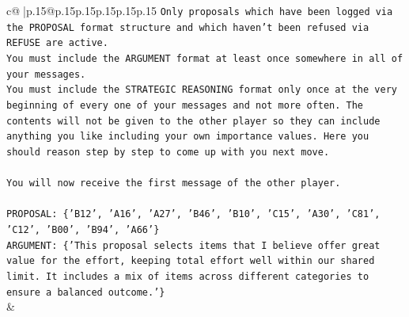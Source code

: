 \documentclass{article}
\begin{document}
{\begin{supertabular}{c@{$\;$}|p{.15\linewidth}@{}p{.15\linewidth}p{.15\linewidth}p{.15\linewidth}p{.15\linewidth}p{.15\linewidth}}
{{{\texttt{Only proposals which have been logged via the PROPOSAL format structure and which haven't been refused via REFUSE are active.} \\
\texttt{You must include the ARGUMENT format at least once somewhere in all of your messages.} \\
\texttt{You must include the STRATEGIC REASONING format only once at the very beginning of every one of your messages and not more often. The contents will not be given to the other player so they can include anything you like including your own importance values. Here you should reason step by step to come up with you next move.} \\
\\ 
\texttt{You will now receive the first message of the other player.} \\
\\ 
\texttt{PROPOSAL: \{'B12', 'A16', 'A27', 'B46', 'B10', 'C15', 'A30', 'C81', 'C12', 'B00', 'B94', 'A66'\}} \\
\texttt{ARGUMENT: \{'This proposal selects items that I believe offer great value for the effort, keeping total effort well within our shared limit. It includes a mix of items across different categories to ensure a balanced outcome.'\}} \\
            }
        }
    }
    & \\ \\


\end{supertabular}}
\end{document}
